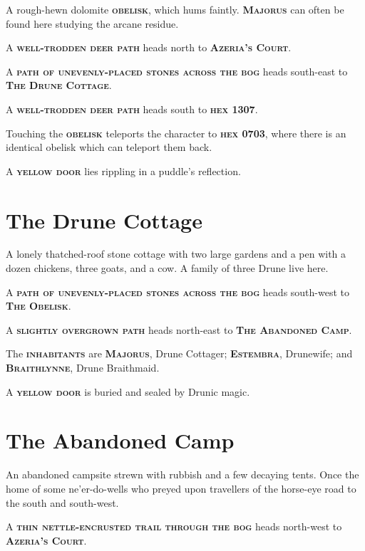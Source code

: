 \documentclass[10pt]{article}
\newcommand\locationcolour{Mahogany}
\newcommand\npccolour{CornflowerBlue}
\newcommand{\keyword}[1]{\textsc{\textbf{#1}}}
\newcommand{\location}[1]{\keyword{\color{\locationcolour}#1}}
\newcommand{\npc}[1]{\keyword{\color{\npccolour}#1}}
\begin{document}
\begin{multicols*}{2}

A rough-hewn dolomite \keyword{obelisk}, which hums faintly.
\npc{Majorus} can often be found here studying the arcane residue.

A \keyword{well-trodden deer path} heads north to \location{Azeria's
  Court}.

A \keyword{path of unevenly-placed stones across the bog} heads
south-east to \location{The Drune Cottage}.

A \keyword{well-trodden deer path} heads south to \location{hex 1307}.

Touching the \keyword{obelisk} teleports the character to
\location{hex 0703}, where there is an identical obelisk which can
teleport them back.

A \keyword{yellow door} lies rippling in a puddle's reflection.

\section{The Drune Cottage}


A lonely thatched-roof stone cottage with two large gardens and a pen
with a dozen chickens, three goats, and a cow.  A family of three
Drune live here.

A \keyword{path of unevenly-placed stones across the bog} heads
south-west to \location{The Obelisk}.

A \keyword{slightly overgrown path} heads north-east to \location{The
  Abandoned Camp}.

The \keyword{inhabitants} are \npc{Majorus}, Drune Cottager;
\npc{Estembra}, Drunewife; and \npc{Braithlynne}, Drune Braithmaid.

A \keyword{yellow door} is buried and sealed by Drunic magic.

\section{The Abandoned Camp}


An abandoned campsite strewn with rubbish and a few decaying tents.
Once the home of some ne'er-do-wells who preyed upon travellers of the
horse-eye road to the south and south-west.

A \keyword{thin nettle-encrusted trail through the bog} heads
north-west to \location{Azeria's Court}.


\end{multicols*}
\end{document}
